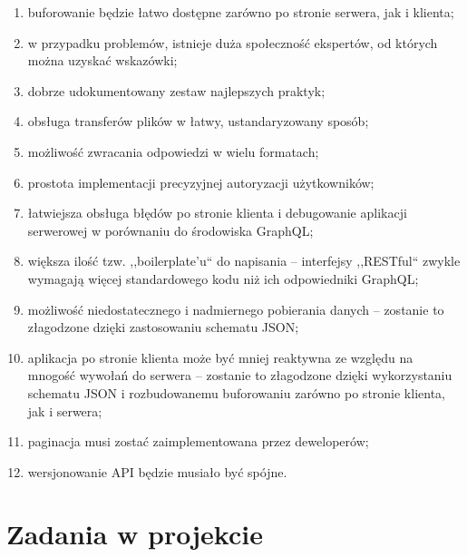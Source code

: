 \documentclass[12pt, a4paper, twoside, openany]{book}
\begin{document}
\begin{enumerate}[label=--]
    \item buforowanie będzie łatwo dostępne zarówno po stronie serwera, jak i klienta;
    \item w przypadku problemów, istnieje duża społeczność ekspertów, od których można uzyskać wskazówki;
    \item dobrze udokumentowany zestaw najlepszych praktyk;
    \item obsługa transferów plików w łatwy, ustandaryzowany sposób;
    \item możliwość zwracania odpowiedzi w wielu formatach;
    \item prostota implementacji precyzyjnej autoryzacji użytkowników;
    \item łatwiejsza obsługa błędów po stronie klienta i debugowanie aplikacji serwerowej w porównaniu do środowiska GraphQL;
    \item większa ilość tzw. ,,boilerplate'u`` do napisania -- interfejsy ,,RESTful`` zwykle wymagają więcej standardowego kodu niż ich odpowiedniki GraphQL;
    \item możliwość niedostatecznego i nadmiernego pobierania danych -- zostanie to złagodzone dzięki zastosowaniu schematu JSON;
    \item aplikacja po stronie klienta może być mniej reaktywna ze względu na mnogość wywołań do serwera -- zostanie to złagodzone dzięki wykorzystaniu schematu JSON i rozbudowanemu buforowaniu zarówno po stronie klienta, jak i serwera;
    \item paginacja musi zostać zaimplementowana przez deweloperów;
    \item wersjonowanie API będzie musiało być spójne.
\end{enumerate}

\newpage
\section{Zadania w projekcie}
\end{document}
